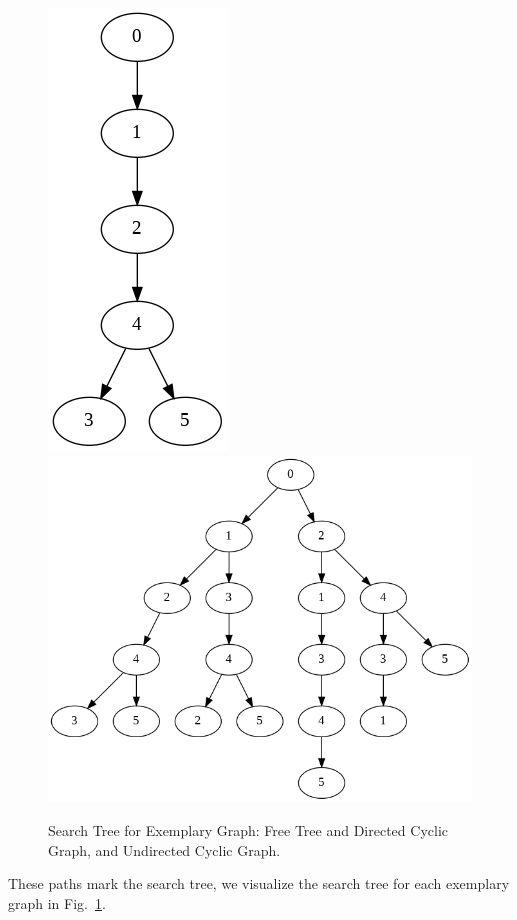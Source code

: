 \documentclass[../main.tex]{subfiles}
\begin{document}
\begin{figure}[!ht]
    \centering
     \includegraphics[width=0.2\columnwidth]{fig/free_tree.png}
      \includegraphics[width=0.75\columnwidth]{fig/search_tree_dfs.png}
    \caption{Search Tree for Exemplary Graph: Free Tree and Directed Cyclic Graph, and Undirected Cyclic Graph.}
    \label{fig:graph_search_example_search_tree}
\end{figure}

These paths mark the search tree, we visualize the search tree for each exemplary graph in Fig.~\ref{fig:graph_search_example_search_tree}. 

\end{document}

